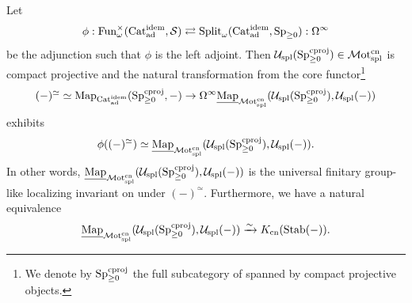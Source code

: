 \documentclass[a4paper,10pt, oneside]{amsart}
\begin{document}
\begin{prop}\label{splmapping}
	Let $$\phi: \funct^{\times}_\omega(\catadidem,\mcs)\rightleftarrows \op{Split}_\omega(\catadidem,\spgeq) : \Omega^\infty$$ be the adjunction such that $\phi$ is the left adjoint. Then $\mcu_{\op{spl}}(\spgeqcproj)\in \motsplcn$ is compact projective and the natural transformation from the core functor\footnote{We denote by $\spgeqcproj$ the full subcategory of \spgeq spanned by compact projective objects.} 
	$$(-)^\simeq\simeq \mapp_{\catadidem}(\spgeqcproj,-)\to \Omega^\infty \unmap_{\motsplcn}(\mcu_{\op{spl}}(\spgeqcproj),\mcu_{\op{spl}}(-))$$  exhibits $$\phi((-)^\simeq)\simeq \unmap_{\motsplcn}(\mcu_{\op{spl}}(\spgeqcproj),\mcu_{\op{spl}}(-)).$$
	In other words, $\unmap_{\motsplcn}(\mcu_{\op{spl}}(\spgeqcproj),\mcu_{\op{spl}}(-))$ is the universal finitary group-like localizing invariant on \catadidem under $(-)^\simeq$. Furthermore, we have a natural equivalence $$\unmap_{\motsplcn}(\mcu_{\op{spl}}(\spgeqcproj),\mcu_{\op{spl}}(-))\xrightarrow{\sim} \kcn(\op{Stab}(-)).$$
\end{prop}
\end{document}
